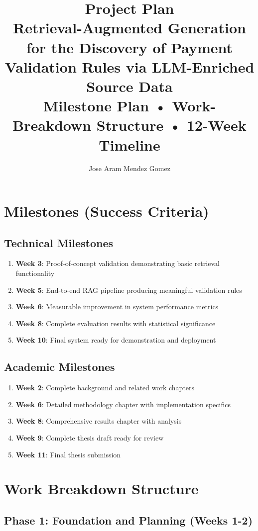\documentclass[11pt,a4paper]{article}
\title{
    \vspace{-2cm}
    {\Huge\bfseries\color{primary} Project Plan}\\[0.5cm]
    {\Large\color{secondary} Retrieval-Augmented Generation for the Discovery of Payment Validation Rules via LLM-Enriched Source Data}\\[0.3cm]
    {\large Milestone Plan • Work-Breakdown Structure • 12-Week Timeline}
}
\author{Jose Aram Mendez Gomez}
\date{}
\begin{document}
\maketitle

\section{Milestones (Success Criteria)}

\subsection{Technical Milestones}
\begin{enumerate}[leftmargin=2em]
\item \textbf{Week 3}: Proof-of-concept validation demonstrating basic retrieval functionality
\item \textbf{Week 5}: End-to-end RAG pipeline producing meaningful validation rules
\item \textbf{Week 6}: Measurable improvement in system performance metrics
\item \textbf{Week 8}: Complete evaluation results with statistical significance
\item \textbf{Week 10}: Final system ready for demonstration and deployment
\end{enumerate}

\subsection{Academic Milestones}
\begin{enumerate}[leftmargin=2em]
\item \textbf{Week 2}: Complete background and related work chapters
\item \textbf{Week 6}: Detailed methodology chapter with implementation specifics
\item \textbf{Week 8}: Comprehensive results chapter with analysis
\item \textbf{Week 9}: Complete thesis draft ready for review
\item \textbf{Week 11}: Final thesis submission
\end{enumerate}

\section{Work Breakdown Structure}

\subsection{Phase 1: Foundation and Planning (Weeks 1-2)}
\end{document}
